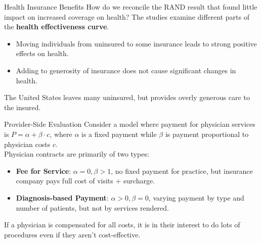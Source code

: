 \documentclass[8pt]{extarticle}
\begin{document}
  \begin{problem}{Health Insurance Benefits}
    How do we reconcile the RAND result that found little impact on increased coverage on health? The studies examine different parts of the \textbf{health effectiveness curve}.
    \begin{itemize}
      \item Moving individuals from uninsured to some insurance leads to strong positive effects on health.
      \item Adding to generosity of insurance does not cause significant changes in health.
    \end{itemize}
    The United States leaves many uninsured, but provides overly generous care to the insured.
  \end{problem}
  \begin{problem}{Provider-Side Evaluation}
    Consider a model where payment for physician services is $P = \alpha + \beta \cdot c$, where $\alpha$ is a fixed payment while $\beta$ is payment proportional to physician costs $c$.\\

    Physician contracts are primarily of two types:
    \begin{itemize}
      \item \textbf{Fee for Service}: $\alpha = 0, \beta > 1$, no fixed payment for practice, but insurance company pays full cost of visits + surcharge.
      \item \textbf{Diagnosis-based Payment}: $\alpha > 0, \beta = 0$, varying payment by type and number of patients, but not by services rendered.
    \end{itemize}
    If a physician is compensated for all costs, it is in their interest to do lots of procedures even if they aren't cost-effective.\\


\end{problem}
\end{document}
